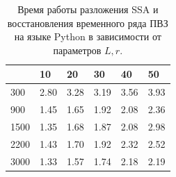 \documentclass[specialist,
			   substylefile = spbu_report.rtx,
			   subf,href,colorlinks=true, 12pt]{disser}
\begin{document}
\begin{table}[htp]
	\centering
	\begin{tabular}{ | l | l | l | l | l | l |}
		
		\hline
		\backslashbox{$L$}{$r$} & 10 & 20 & 30 & 40 & 50 \\ 
		\hline
		300 & 2.80 & 3.28 & 3.19 & 3.56 & 3.93  \\
		\hline
		900 & 1.45 & 1.65 & 1.92 & 2.08 & 2.36 \\
		\hline
		1500 & 1.35 & 1.68 & 1.87 & 2.08 & 2.98 \\
		\hline
		2200 & 1.43 & 1.70 & 1.92 & 2.32 & 2.52 \\
		\hline
		3000 & 1.33 & 1.57 & 1.74 & 2.18 & 2.19 \\
		\hline
	\end{tabular}
	\caption{\label{tab:py-time-table} Время работы разложения SSA и восстановления временного ряда ПВЗ на языке Python в зависимости от параметров $L, r$.}
\end{table}
\end{document}

